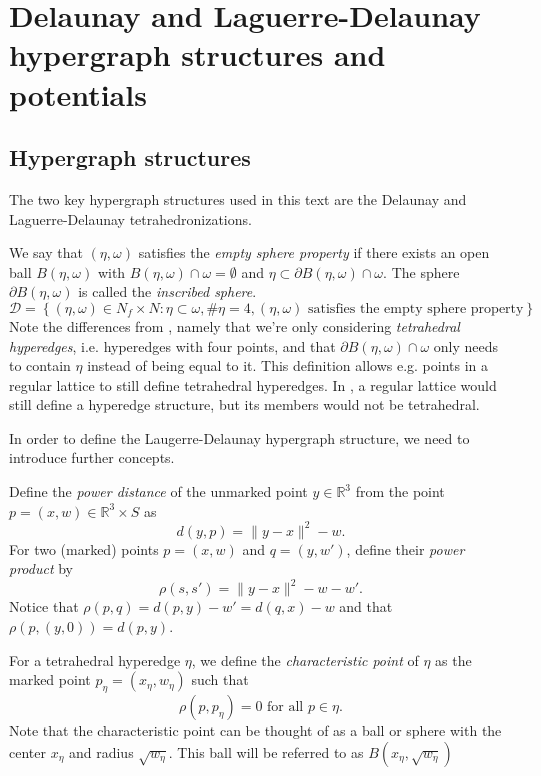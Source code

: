 \documentclass[12pt,a4paper]{report}
\newcommand{\R}{\mathbb R^3}
\begin{document}
\section{Delaunay and Laguerre-Delaunay hypergraph structures and potentials}
\subsection{Hypergraph structures}
The two key hypergraph structures used in this text are the Delaunay and Laguerre-Delaunay tetrahedronizations. 

We say that $(\eta,\omega)$ satisfies the \textit{empty sphere property} if there exists an open ball $B(\eta,\omega)$ with $B(\eta,\omega)\cap \omega = \emptyset$ and $\eta \subset \partial B(\eta,\omega) \cap \omega$. The sphere $\partial B(\eta,\omega)$ is called the \textit{inscribed sphere}. 
$$\mathcal D = \left\{ (\eta,\omega) \in N_f \times N: \eta \subset \omega, \# \eta = 4, (\eta,\omega) \text{ satisfies the empty sphere property} \right\} $$ 
Note the differences from \cite{DDG11}, namely that we're only considering \textit{tetrahedral hyperedges}, i.e. hyperedges with four points, and that $\partial B(\eta,\omega) \cap \omega$ only needs to contain $\eta$ instead of being equal to it. This definition allows e.g. points in a regular lattice to still define tetrahedral hyperedges. In \cite{DDG11}, a regular lattice would still define a hyperedge structure, but its members would not be tetrahedral. 

In order to define the Laugerre-Delaunay hypergraph structure, we need to introduce further concepts.

Define the \textit{power distance} of the unmarked point $y \in\R$ from the point $p=(x,w) \in \R\times S$ as
$$d(y,p) = \|y-x\|^2 - w.$$
For two (marked) points $p=(x,w)$ and $q=(y,w')$, define their \textit{power product} by
$$\rho(s,s') = \|y-x\|^2 - w - w'.$$
Notice that $\rho(p,q) = d(p,y) - w' = d(q,x) - w$ and that $\rho(p,(y,0)) = d(p,y)$.


For a tetrahedral hyperedge $\eta$, we define the \textit{characteristic point} of $\eta$ as the marked point $p_\eta = (x_\eta, w_\eta)$ such that
$$\rho(p,p_\eta)=0 \text{ for all } p \in \eta.$$
Note that the characteristic point can be thought of as a ball or sphere with the center $x_\eta$ and radius $\sqrt{w_\eta}$. This ball will be referred to as $B(x_\eta,\sqrt{w_\eta})$
\end{document}
